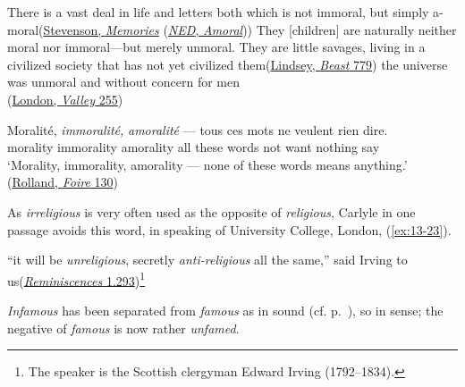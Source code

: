 \ea \label{ex:13-19}
\ea There is a vast deal in life and letters both which is not immoral, but simply a-moral\hfill(\href{https://archive.org/details/memoriesportrait00sev/page/232/mode/2up?q=%22vast+deal+in%22&view=theater}{Stevenson, \textit{Memories}} (\href{https://archive.org/details/in.ernet.dli.2015.211152/page/n317/mode/2up?view=theater}{\textit{NED}, \textit{Amoral}})) 
\ex They [children] are naturally neither moral nor immoral---but merely unmoral. They are little savages, living in a civilized society that has not yet civilized them\hfill (\href{https://archive.org/details/beas00lind/page/134/mode/2up?q=%22naturally+neither+moral+nor+immoral%22&view=theater}{Lindsey, \textit{Beast} 779}) %
\ex the universe was unmoral and without concern for men\\\hfill(\href{https://www.gutenberg.org/files/1449/1449-h/1449-h.htm#link2HCH0031}{London, \textit{Valley} 255})%
\z
\z

\ea \label{ex:13-22}
\gll Moralité, \emph{immoralité,} \emph{amoralité} --- tous ces mots ne veulent rien dire.\\
 morality immorality amorality {} all these words not want nothing say\\
\glt `Morality, immorality, amorality --- none of these words means anything.'
\\\hfill(\href{https://www.gutenberg.org/cache/epub/61876/pg61876-images.html}{Rolland, \textit{Foire} 130})
\z


As \textit{irreligious} is very often used as the opposite of \textit{religious}, Carlyle in one passage avoids this word, in speaking of University College, London, (\ref{ex:13-23}).

\ea \label{ex:13-23} ``it will be \emph{unreligious}, secretly \emph{anti-religious} all the same,'' said Irving to us\hfill(\href{https://archive.org/details/reminiscences0000thom_e9a0/page/232/mode/2up?q=%22will+be+unreligious%22&view=theater}{\textit{Reminiscences} 1.293})\footnote{The speaker is the Scottish clergyman Edward Irving (1792--1834). \eds} %
\z

\label{meaning_change}\textit{Infamous} has been separated from \textit{famous} as in sound (cf. p.~\pageref{sound_change}), so in sense; the negative of \textit{famous} is now rather \textit{unfamed}.

